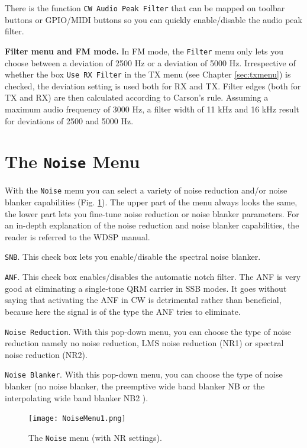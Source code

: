 \documentclass[12pt]{book}
\def\rett#1{\texttt{\color{red}#1}}
\def\bltt#1{\texttt{\color{blue}#1}}
\begin{document}
There is the function \bltt{CW Audio Peak Filter} that can be mapped on toolbar
buttons or GPIO/MIDI buttons so you can quickly enable/disable the audio peak
filter.

\textbf{Filter menu and FM mode.} In FM mode, the \bltt{Filter} menu only lets you
choose between a deviation of 2500 Hz or a deviation of 5000 Hz.
Irrespective of whether the box \rett{Use RX Filter} in the TX menu (see
Chapter \ref{sec:txmenu}) is checked, the deviation setting is used both for RX and TX.
Filter edges (both for
TX and RX) are then calculated according to Carson's rule. Assuming a maximum audio
frequency of 3000 Hz, a filter width of 11 kHz and 16 kHz result for deviations of 2500
and 5000 Hz.

\section{The \texttt{Noise} Menu}



With the \bltt{Noise} menu you can select a variety of noise reduction and/or
noise blanker capabilities (Fig. \ref{fig:NoiseMenu1}). The upper part of the
menu always looks the same, the lower part lets you fine-tune noise reduction
or noise blanker parameters. For an in-depth explanation of the noise reduction
and noise blanker capabilities, the reader is referred to the WDSP manual.

\rett{SNB}. This check box lets you enable/disable the spectral noise blanker.

\rett{ANF}. This check box enables/disables the automatic notch filter. The ANF is
very good at eliminating a single-tone QRM carrier in SSB modes. It goes without
saying that activating the ANF in CW is detrimental rather than beneficial, because
here the signal is of the type the ANF tries to eliminate.

\rett{Noise Reduction}. With this pop-down menu, you can choose the type of noise reduction
namely no noise reduction, LMS noise reduction (NR1) or spectral noise reduction (NR2).

\rett{Noise Blanker}. With this pop-down menu, you can choose the type of noise blanker
(no noise blanker, the preemptive wide band blanker NB or the interpolating wide band
blanker NB2 ).

\begin{figure}[ht]
\center
\texttt{[image: NoiseMenu1.png]}
\caption{The \bltt{Noise} menu (with NR settings).}
\label{fig:NoiseMenu1}
\end{figure}
\end{document}
